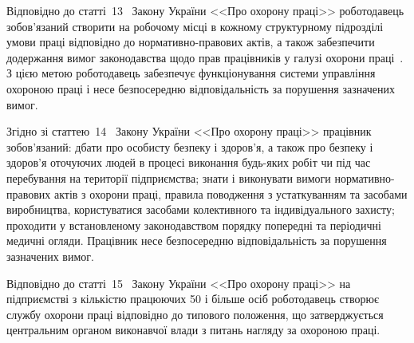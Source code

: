 \documentclass[a4paper,fontsize=14bp,ukrainian]{extreport}
\begin{document}


Відповідно до статті~13~\cite{law_aboutwork1992} Закону України <<Про охорону праці>> роботодавець зобов'язаний створити на робочому місці в кожному структурному підрозділі умови праці відповідно до нормативно-правових актів, а також забезпечити додержання вимог законодавства щодо прав працівників у галузі охорони праці~\cite{tkachuk2006}. З цією метою роботодавець забезпечує функціонування системи управління охороною праці і несе безпосередню відповідальність за порушення зазначених вимог.

Згідно зі статтею~14~\cite{law_aboutwork1992} Закону України <<Про охорону праці>> працівник зобов'язаний: дбати про особисту безпеку і здоров'я, а також про безпеку і здоров'я оточуючих людей в процесі виконання будь-яких робіт чи під час перебування на території підприємства; знати і виконувати вимоги нормативно-правових актів з охорони праці, правила поводження з  устаткуванням та засобами виробництва, користуватися засобами колективного та індивідуального захисту; проходити у встановленому законодавством порядку попередні та періодичні медичні огляди. Працівник несе безпосередню відповідальність за порушення зазначених вимог.

Відповідно до статті~15~\cite{law_aboutwork1992} Закону України <<Про охорону праці>> на підприємстві з кількістю працюючих 50 і більше осіб роботодавець створює службу охорони праці відповідно до типового положення, що затверджується центральним органом виконавчої влади з питань нагляду за охороною праці.
\end{document}
